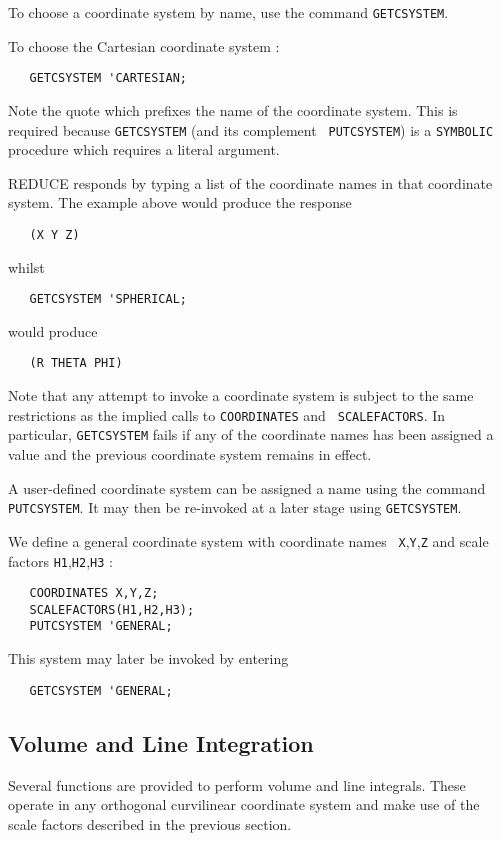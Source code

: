 To choose a coordinate system by name, use the command {\tt GETCSYSTEM}.

To choose the Cartesian coordinate system :
\begin{verbatim}
   GETCSYSTEM 'CARTESIAN;
\end{verbatim}
Note the quote which prefixes the name of the coordinate system. This
is required because {\tt GETCSYSTEM} (and its complement {\tt
PUTCSYSTEM}) is a {\tt SYMBOLIC} procedure which requires a literal
argument.

REDUCE responds by typing a list of the coordinate names in that
coordinate system. The example above would produce the response
\begin{verbatim}
   (X Y Z)
\end{verbatim}
whilst
\begin{verbatim}
   GETCSYSTEM 'SPHERICAL;
\end{verbatim}
would produce
\begin{verbatim}
   (R THETA PHI)
\end{verbatim}
Note that any attempt to invoke a coordinate system is subject to the
same restrictions as the implied calls to {\tt COORDINATES} and {\tt
SCALEFACTORS}.  In particular, {\tt GETCSYSTEM} fails if any of the
coordinate names has been assigned a value and the previous coordinate
system remains in effect.

A user-defined coordinate system can be assigned a name using the
command {\tt PUTCSYSTEM}. It may then be re-invoked at a later stage using
{\tt GETCSYSTEM}.

\example{}

We define a general coordinate system with coordinate names {\tt
X},{\tt Y},{\tt Z} and scale factors {\tt H1},{\tt H2},{\tt H3} :
\begin{verbatim}
   COORDINATES X,Y,Z;
   SCALEFACTORS(H1,H2,H3);
   PUTCSYSTEM 'GENERAL;
\end{verbatim}
This system may later be invoked by entering
\begin{verbatim}
   GETCSYSTEM 'GENERAL;
\end{verbatim}

\subsection{Volume and Line Integration}

Several functions are provided to perform volume and line integrals.
These operate in any orthogonal curvilinear coordinate system and
make use of the scale factors described in the previous section.


